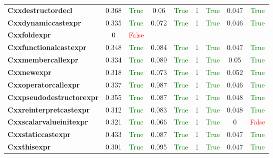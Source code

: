 \documentclass{article}
\begin{document}
\begin{xltabular}{\textwidth}{lcccccccc}
\textbf{{\fontsize{10}{12}\selectfont Cxxdestructordecl}}& 0.368&\textcolor{green}{True}& 0.06&\textcolor{green}{True}& 1&\textcolor{green}{True}& 0.047&\textcolor{green}{True} \\[0.5ex]
\textbf{{\fontsize{10}{12}\selectfont Cxxdynamiccastexpr}}& 0.335&\textcolor{green}{True}& 0.072&\textcolor{green}{True}& 1&\textcolor{green}{True}& 0.046&\textcolor{green}{True} \\[0.5ex]
\textbf{{\fontsize{10}{12}\selectfont Cxxfoldexpr}}& 0&\textcolor{red}{False} \\[0.5ex]
\textbf{{\fontsize{10}{12}\selectfont Cxxfunctionalcastexpr}}& 0.348&\textcolor{green}{True}& 0.084&\textcolor{green}{True}& 1&\textcolor{green}{True}& 0.047&\textcolor{green}{True} \\[0.5ex]
\textbf{{\fontsize{10}{12}\selectfont Cxxmembercallexpr}}& 0.334&\textcolor{green}{True}& 0.089&\textcolor{green}{True}& 1&\textcolor{green}{True}& 0.05&\textcolor{green}{True} \\[0.5ex]
\textbf{{\fontsize{10}{12}\selectfont Cxxnewexpr}}& 0.318&\textcolor{green}{True}& 0.073&\textcolor{green}{True}& 1&\textcolor{green}{True}& 0.052&\textcolor{green}{True} \\[0.5ex]
\textbf{{\fontsize{10}{12}\selectfont Cxxoperatorcallexpr}}& 0.337&\textcolor{green}{True}& 0.087&\textcolor{green}{True}& 1&\textcolor{green}{True}& 0.046&\textcolor{green}{True} \\[0.5ex]
\textbf{{\fontsize{10}{12}\selectfont Cxxpseudodestructorexpr}}& 0.355&\textcolor{green}{True}& 0.087&\textcolor{green}{True}& 1&\textcolor{green}{True}& 0.048&\textcolor{green}{True} \\[0.5ex]
\textbf{{\fontsize{10}{12}\selectfont Cxxreinterpretcastexpr}}& 0.312&\textcolor{green}{True}& 0.083&\textcolor{green}{True}& 1&\textcolor{green}{True}& 0.048&\textcolor{green}{True} \\[0.5ex]
\textbf{{\fontsize{10}{12}\selectfont Cxxscalarvalueinitexpr}}& 0.321&\textcolor{green}{True}& 0.066&\textcolor{green}{True}& 1&\textcolor{green}{True}& 0&\textcolor{red}{False} \\[0.5ex]
\textbf{{\fontsize{10}{12}\selectfont Cxxstaticcastexpr}}& 0.433&\textcolor{green}{True}& 0.087&\textcolor{green}{True}& 1&\textcolor{green}{True}& 0.047&\textcolor{green}{True} \\[0.5ex]
\textbf{{\fontsize{10}{12}\selectfont Cxxthisexpr}}& 0.301&\textcolor{green}{True}& 0.095&\textcolor{green}{True}& 1&\textcolor{green}{True}& 0.047&\textcolor{green}{True} \\[0.5ex]

\end{xltabular}
\end{document}
